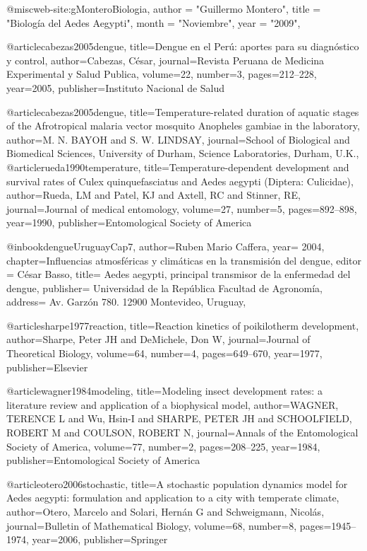 @misc{web-site:gMonteroBiologia,
      author = "Guillermo Montero",
      title = "Biología del Aedes Aegypti",
      month = "Noviembre",
      year = "2009",
}

@article{cabezas2005dengue,
  title={Dengue en el Per{\'u}: aportes para su diagn{\'o}stico y control},
  author={Cabezas, C{\'e}sar},
  journal={Revista Peruana de Medicina Experimental y Salud Publica},
  volume={22},
  number={3},
  pages={212--228},
  year={2005},
  publisher={Instituto Nacional de Salud}
}

@article{cabezas2005dengue,
  title={Temperature-related duration of aquatic stages of the Afrotropical malaria vector mosquito Anopheles gambiae in the laboratory},
  author={M. N. BAYOH and S. W. LINDSAY},
  journal={School of Biological and Biomedical Sciences, University of Durham, Science Laboratories, Durham, U.K.},
}
@article{rueda1990temperature,
  title={Temperature-dependent development and survival rates of Culex quinquefasciatus and Aedes aegypti (Diptera: Culicidae)},
  author={Rueda, LM and Patel, KJ and Axtell, RC and Stinner, RE},
  journal={Journal of medical entomology},
  volume={27},
  number={5},
  pages={892--898},
  year={1990},
  publisher={Entomological Society of America}
}

@inbook{dengueUruguayCap7,
  author={Ruben Mario Caffera},
  year= 2004, 
  chapter={Influencias atmosféricas y climáticas en la transmisión del dengue}, 
  editor = {César Basso}, 
  title= {Aedes aegypti, principal transmisor de la enfermedad del dengue}, 
  publisher= {Universidad de la República Facultad de Agronomía},
  address= {Av. Garzón 780. 12900 Montevideo, Uruguay}, 
}

@article{sharpe1977reaction,
  title={Reaction kinetics of poikilotherm development},
  author={Sharpe, Peter JH and DeMichele, Don W},
  journal={Journal of Theoretical Biology},
  volume={64},
  number={4},
  pages={649--670},
  year={1977},
  publisher={Elsevier}
}

@article{wagner1984modeling,
  title={Modeling insect development rates: a literature review and application of a biophysical model},
  author={WAGNER, TERENCE L and Wu, Hsin-I and SHARPE, PETER JH and SCHOOLFIELD, ROBERT M and COULSON, ROBERT N},
  journal={Annals of the Entomological Society of America},
  volume={77},
  number={2},
  pages={208--225},
  year={1984},
  publisher={Entomological Society of America}
}

@article{otero2006stochastic,
  title={A stochastic population dynamics model for Aedes aegypti: formulation and application to a city with temperate climate},
  author={{Otero}, {Marcelo and Solari, Hern{\'a}n G and Schweigmann, Nicol{\'a}s}},
  journal={Bulletin of Mathematical Biology},
  volume={68},
  number={8},
  pages={1945--1974},
  year={2006},
  publisher={Springer}
}
